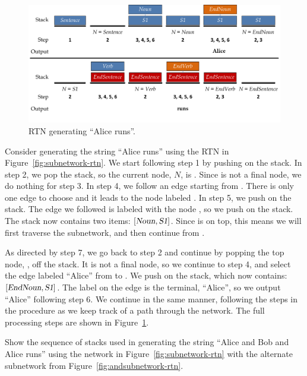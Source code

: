 \begin{figure}[!t]\centering
\includegraphics[width=4.85in]{figures/processing-rtn.pdf}
\caption{RTN generating ``Alice runs''.}\label{fig:rtn-processing}
\end{figure}

Consider generating the string ``Alice runs'' using the RTN in Figure~\ref{fig:subnetwork-rtn}.  We start following step 1 by pushing  on the stack.  In step 2, we pop the stack, so the current node, $N$, is .  Since  is not a final node, we do nothing for step 3.  In step 4, we follow an edge starting from .  There is only one edge to choose and it leads to the node labeled .  In step 5, we push  on the stack.  The edge we followed is labeled with the node , so we push  on the stack.  The stack now contains two items: $\left[\textsl{Noun}, \textsl{S1}\right]$. %
Since  is on top, this means we will first traverse the  subnetwork, and then continue from .

As directed by step 7, we go back to step 2 and continue by popping the top node, , off the stack.  It is not a final node, so we continue to step 4, and select the edge labeled ``Alice'' from  to .  We push  on the stack, which now contains: $\left[\textsl{EndNoun}, \textsl{S1}\right]$.  The label on the edge is the terminal, ``Alice'', so we output ``Alice'' following step 6.  We continue in the same manner, following the steps in the procedure as we keep track of a path through the network.  The full processing steps are shown in Figure~\ref{fig:rtn-processing}.

\beforeex
\begin{exercise}\bluestar 
Show the sequence of stacks used in generating the string ``Alice and Bob and Alice runs'' using the network in Figure~\ref{fig:subnetwork-rtn} with the alternate  subnetwork from Figure~\ref{fig:andsubnetwork-rtn}.
\solution{\LATER{}}
\end{exercise}
\afterex

